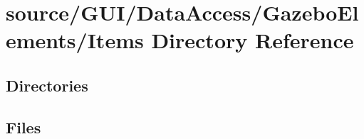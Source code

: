 \section{source/\+G\+U\+I/\+Data\+Access/\+Gazebo\+Elements/\+Items Directory Reference}
\label{dir_f1b87569826b5b5013cc16ad8cbf6484}
\subsection*{Directories}
\begin{DoxyCompactItemize}
\end{DoxyCompactItemize}
\subsection*{Files}
\begin{DoxyCompactItemize}
\end{DoxyCompactItemize}
